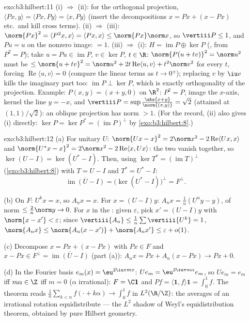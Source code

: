 \begin{solution}{exo:b3:hilbert:11}
(i) $\Rightarrow$ (ii): for the orthogonal projection,
$\langle Px, y\rangle = \langle Px, Py\rangle = \langle x,
Py\rangle$ (insert the decompositions $x = Px + (x - Px)$
etc.\ and kill cross terms). (ii) $\Rightarrow$ (iii):
$\norm{Px}^2 = \langle P^2x, x\rangle = \langle Px, x\rangle
\leq \norm{Px}\norm x$, so $\vertiii P \leq 1$, and $Pu = u$
on the nonzero image: $= 1$. (iii) $\Rightarrow$ (i): $H =
\operatorname{im}P \oplus \ker P$ (, from $P^2
= P$); take $u = Pu \in \operatorname{im}P$, $v \in \ker P$,
$t \in \R$: $\norm{P(u + tv)}^2 = \norm u^2$ must be $\leq
\norm{u + tv}^2 = \norm u^2 + 2t\operatorname{Re}\langle u,
v\rangle + t^2\norm v^2$ for every $t$, forcing
$\operatorname{Re}\langle u, v\rangle = 0$ (compare the
linear terms as $t \to 0^\pm$); replacing $v$ by $\iu v$
kills the imaginary part too: $\operatorname{im}P \perp
\ker P$, which is exactly orthogonality of the projection.
Example: $P(x, y) = (x + y, 0)$ on $\R^2$: $P^2 = P$,
image the $x$-axis, kernel the line $y = -x$, and
$\vertiii P = \sup\frac{\abs{x+y}}{\norm{(x,y)}} = \sqrt2$
(attained at $(1,1)/\sqrt2$): an oblique projection has norm
$> 1$. (For the record, (ii) also gives (i) directly:
$\ker P = \ker P^* = (\operatorname{im}P)^\perp$ by
\cref{exo:b3:hilbert:8}.)
\end{solution}

\begin{solution}{exo:b3:hilbert:12}
(a) For unitary $U$: $\norm{Ux - x}^2 = 2\norm x^2 -
2\operatorname{Re}\langle Ux, x\rangle$ and $\norm{U^*x -
x}^2 = 2\norm x^2 - 2\operatorname{Re}\langle x, Ux\rangle$:
the two vanish together, so $\ker(U - I) = \ker(U^* - I)$.
Then, using $\ker T^* = (\operatorname{im}T)^\perp$
(\cref{exo:b3:hilbert:8}) with $T = U - I$ and $T^* = U^* -
I$:
\[
\overline{\operatorname{im}(U - I)} = \bigl(\ker(U^* -
I)\bigr)^\perp = F^\perp .
\]

(b) On $F$: $U^kx = x$, so $A_nx = x$. For $x = (U - I)y$:
$A_nx = \frac1n(U^ny - y)$, of norm $\leq \frac2n\norm y \to
0$. For $x$ in the : given $\varepsilon$, pick $x' =
(U - I)y$ with $\norm{x - x'} < \varepsilon$; since
$\vertiii{A_n} \leq \frac1n\sum\vertiii{U^k} = 1$,
$\norm{A_nx} \leq \norm{A_n(x - x')} + \norm{A_nx'} \leq
\varepsilon + o(1)$.

(c) Decompose $x = Px + (x - Px)$ with $Px \in F$ and $x -
Px \in F^\perp = \overline{\operatorname{im}(U - I)}$ (part
(a)): $A_nx = Px + A_n(x - Px) \to Px + 0$.

(d) In the Fourier basis $e_m(x) = \eu^{2\iu\pi mx}$: $Ue_m
= \eu^{2\iu\pi m\alpha}e_m$, so $Ue_m = e_m$ iff $m\alpha
\in \Z$ iff $m = 0$ ($\alpha$ irrational): $F = \C\mathbf 1$
and $Pf = \langle\mathbf 1, f\rangle\mathbf 1 = \int_0^1f$.
The theorem reads $\frac1n\sum_{k<n}f(\cdot + k\alpha) \to
\int_0^1f$ in $L^2(\R/\Z)$: the  averages of an
irrational rotation equidistribute --- the $L^2$ shadow of
Weyl's equidistribution theorem, obtained by pure Hilbert
geometry.
\end{solution}


